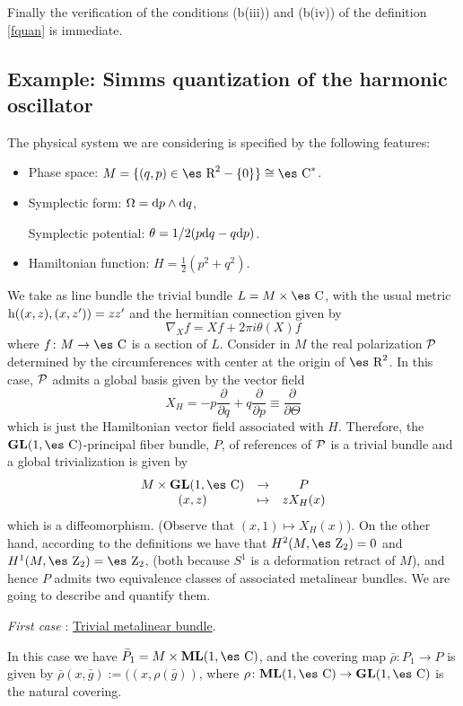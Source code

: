\documentclass[12pt]{article}
\def\derpar#1#2{\frac{\partial{#1}}{\partial{#2}}}
\def\qed{\ifvmode\removelastskip\fi
{\unskip\nobreak\hfil\penalty50\hbox{}\nobreak\hfil
\hbox{\vrule height1.2ex width1.2ex}\parfillskip=0pt
\finalhyphendemerits=0 \par\smallskip}}
\def\d{{\rm d}}
\def\h{{\rm h}}
\def\Zahl{\mbox{\es Z}}
\def\Real{\mbox{\es R}}
\def\Complex{\mbox{\es C}}
\begin{document}
Finally the verification of the conditions (b(iii)) and (b(iv)) of the
definition \ref{fquan}
is immediate.
\qed



\subsection{Example: Simms quantization of the harmonic oscillator}


The physical system we are considering is specified by the following
features:
\begin{itemize}
\item
Phase space:
$M = \{ (q,p) \in \Real^2-\{ 0 \} \} \cong \Complex^*$.
\item
Symplectic form:
$\Omega = \d p \wedge \d q$,

Symplectic potential:
$\theta = 1/2 (p \d q - q \d p)$.
\item
Hamiltonian function:
$H = \frac{1}{2} (p^2 + q^2)$.
\end{itemize}
We take as line bundle the trivial bundle $L=M \times \Complex$,
with the usual metric $\h ((x,z),(x,z'))=zz'$
and the hermitian connection given by
$$
\nabla_Xf = Xf+2\pi i \theta(X)f
$$
where $f \colon M \to \Complex$ is a section of $L$.
Consider in $M$ the real polarization ${\cal P}$ determined by the
circumferences
with center at the origin of $\Real^2$. In this case, ${\cal P}$
admits a global basis given by the vector field
$$
X_H = -p\derpar{}{q} +q\derpar{}{p} \equiv \derpar{}{\Theta}
$$
which is just the Hamiltonian vector field associated with $H$.
Therefore, the ${\bf GL}(1,\Complex )$-principal fiber bundle, $P$,
of references of ${\cal P}$ is a trivial bundle and a global
trivialization is given by
$$
\begin{array}{ccc}
M \times {\bf GL}(1,\Complex ) & \rightarrow & P
\\
(x,z) & \mapsto & z X_H(x)
\end{array}
$$
which is a diffeomorphism. (Observe that $(x,1) \mapsto X_H(x)$).
On the other hand, according to the definitions we have that
$H^2(M,\Zahl_2)=0$ and $H^1(M,\Zahl_2)=\Zahl_2$,
(both because $S^1$ is a deformation retract of $M$),
and hence $P$ admits two equivalence classes of
associated metalinear bundles.
We are going to describe and quantify them.

{\it First case \/}: \underline{Trivial metalinear bundle}.

In this case we have $\bar P_1 = M \times {\bf ML}(1,\Complex )$,
and the covering map $\bar \rho \colon P_1 \to P$
is given by $\bar \rho (x,\bar g) := ((x,\rho (\bar g))$,
where $\rho \colon {\bf ML}(1,\Complex ) \to {\bf GL}(1,\Complex )$
is the natural covering.
\end{document}
